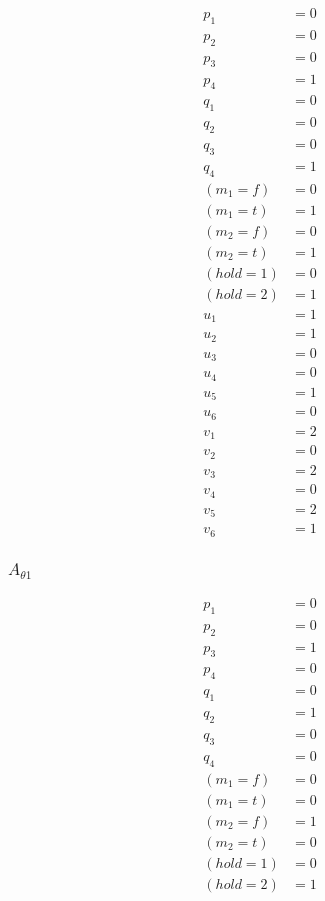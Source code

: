 \documentclass{scrartcl}
\begin{document}
\begin{align*}
  p_1 &= 0 \\
  p_2 &= 0 \\
  p_3 &= 0 \\
  p_4 &= 1 \\
  q_1 &= 0 \\
  q_2 &= 0 \\
  q_3 &= 0 \\
  q_4 &= 1 \\
  (m_1=f) &= 0 \\
  (m_1=t) &= 1 \\
  (m_2=f) &= 0 \\
  (m_2=t) &= 1 \\
  (hold=1) &= 0 \\
  (hold=2) &= 1 \\
  u_1 &= 1 \\
  u_2 &= 1 \\
  u_3 &= 0 \\
  u_4 &= 0 \\
  u_5 &= 1 \\
  u_6 &= 0 \\
  v_1 &= 2 \\
  v_2 &= 0 \\
  v_3 &= 2 \\
  v_4 &= 0 \\
  v_5 &= 2 \\
  v_6 &= 1
\end{align*}

\subsubsection{$A_{\theta 1}$}
\begin{align*}
  p_1 &= 0 \\
  p_2 &= 0 \\
  p_3 &= 1 \\
  p_4 &= 0 \\
  q_1 &= 0 \\
  q_2 &= 1 \\
  q_3 &= 0 \\
  q_4 &= 0 \\
  (m_1=f) &= 0 \\
  (m_1=t) &= 0 \\
  (m_2=f) &= 1 \\
  (m_2=t) &= 0 \\
  (hold=1) &= 0 \\
  (hold=2) &= 1
\end{align*}
\end{document}

